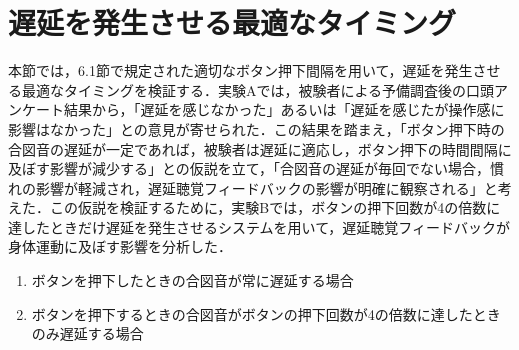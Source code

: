 \section{遅延を発生させる最適なタイミング}
本節では，6.1節で規定された適切なボタン押下間隔を用いて，遅延を発生させる最適なタイミングを検証する．実験Aでは，被験者による予備調査後の口頭アンケート結果から，「遅延を感じなかった」あるいは「遅延を感じたが操作感に影響はなかった」との意見が寄せられた．この結果を踏まえ，「ボタン押下時の合図音の遅延が一定であれば，被験者は遅延に適応し，ボタン押下の時間間隔に及ぼす影響が減少する」との仮説を立て，「合図音の遅延が毎回でない場合，慣れの影響が軽減され，遅延聴覚フィードバックの影響が明確に観察される」と考えた．この仮説を検証するために，実験Bでは，ボタンの押下回数が4の倍数に達したときだけ遅延を発生させるシステムを用いて，遅延聴覚フィードバックが身体運動に及ぼす影響を分析した．
　\begin{enumerate}[leftmargin=*, label=実験(\Alph*)]
    \item ボタンを押下したときの合図音が常に遅延する場合
    \item ボタンを押下するときの合図音がボタンの押下回数が4の倍数に達したときのみ遅延する場合
　\end{enumerate}
 
